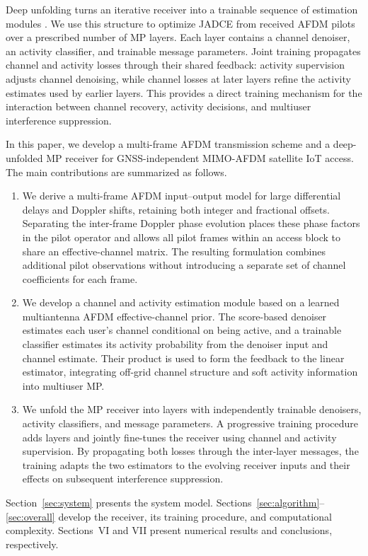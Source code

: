 Deep unfolding turns an iterative receiver into a trainable sequence of
estimation modules \cite{he2020}. We use this structure to optimize
JADCE from received AFDM pilots over a prescribed number of MP layers.
Each layer contains a channel denoiser, an activity classifier, and
trainable message parameters. Joint training propagates channel and
activity losses through their shared feedback: activity supervision
adjusts channel denoising, while channel losses at later layers refine
the activity estimates used by earlier layers. This provides a direct
training mechanism for the interaction between channel recovery,
activity decisions, and multiuser interference suppression.

In this paper, we develop a multi-frame AFDM transmission scheme and a
deep-unfolded MP receiver for GNSS-independent MIMO-AFDM satellite IoT
access. The main contributions are summarized as follows.
\begin{enumerate}[label=\arabic*)]
\item We derive a multi-frame AFDM input--output model for large
differential delays and Doppler shifts, retaining both integer and
fractional offsets. Separating the inter-frame Doppler phase evolution
places these phase factors in the pilot operator and allows all pilot
frames within an access block to share an effective-channel matrix.
The resulting formulation combines additional pilot observations
without introducing a separate set of channel coefficients for each
frame.

\item We develop a channel and activity estimation module based on a
learned multiantenna AFDM effective-channel prior. The score-based
denoiser estimates each user's channel conditional on being active, and a
trainable classifier estimates its activity probability from the
denoiser input and channel estimate. Their product is used to form the
feedback to the linear estimator, integrating off-grid channel
structure and soft activity information into multiuser MP.

\item We unfold the MP receiver into layers with independently
trainable denoisers, activity classifiers, and message parameters.
A progressive training procedure adds layers and jointly fine-tunes
the receiver using channel and activity supervision. By propagating
both losses through the inter-layer messages, the training adapts the
two estimators to the evolving receiver inputs and their effects on
subsequent interference suppression.
\end{enumerate}

Section~\ref{sec:system} presents the system model.
Sections~\ref{sec:algorithm}--\ref{sec:overall} develop the receiver,
its training procedure, and computational complexity. Sections~VI and
VII present numerical results and conclusions, respectively.
